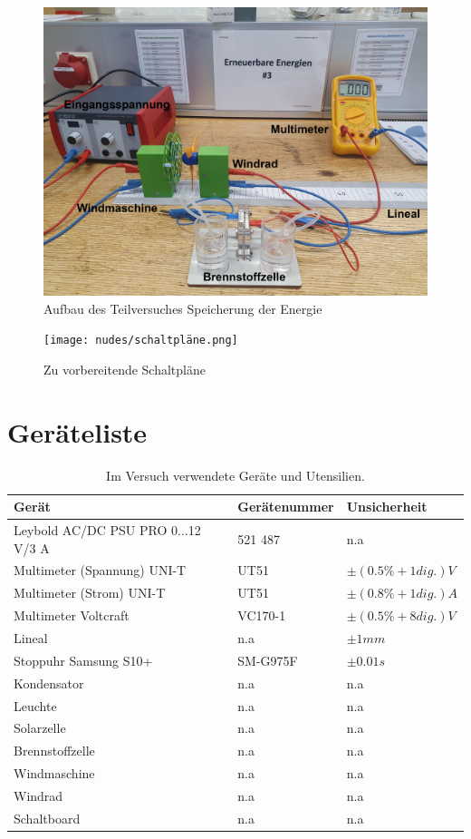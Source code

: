 \documentclass[12pt,a4paper,twoside]{article}
\begin{document}
    \begin{figure}[H]
        \centering
        \includegraphics[width=0.6\linewidth]{nudes/wind und brennstoff.jpg}
        \caption{Aufbau des Teilversuches Speicherung der Energie}
        \label{fig:aufbau Speicherung Energie}
    \end{figure}

    \begin{figure}[H]
        \centering
        \texttt{[image: nudes/schaltpläne.png]}
        \caption{Zu vorbereitende Schaltpläne}
        \label{fig:schaltpläne}
    \end{figure}

\section{Geräteliste} %

    \begin{table}[H]
        \centering
        \caption{Im Versuch verwendete Geräte und Utensilien.}
        \label{tab:geraete}
        \begin{tabular}{| l | l | l |}
            \hline
            Gerät  & Gerätenummer  & Unsicherheit \\
            \hline
            Leybold AC/DC PSU PRO 0...12 V/3 A& 521 487 & {n.a} \\
            Multimeter (Spannung) UNI-T & UT51 & $\pm (0.5 \% + 1 dig.)V$ \cite{multimeter1} \\
            Multimeter (Strom) UNI-T & UT51 & $\pm (0.8 \% + 1 dig.)A$  \cite{multimeter1} \\
            Multimeter Voltcraft & VC170-1 & $\pm (0.5 \% + 8 dig.)V$ \cite{multimeter2} \\
            Lineal & {n.a} & $\pm 1mm $ \\
            Stoppuhr Samsung S10+ & SM-G975F & $\pm 0.01s$ \\
            Kondensator & {n.a} & {n.a} \\
            Leuchte & {n.a} & {n.a} \\
            Solarzelle & {n.a} & {n.a} \\
            Brennstoffzelle & {n.a} & {n.a} \\
            Windmaschine & {n.a} & {n.a} \\
            Windrad & {n.a} & {n.a} \\
            Schaltboard & {n.a} & {n.a} \\
            \hline
        \end{tabular}
    \end{table}
\end{document}
